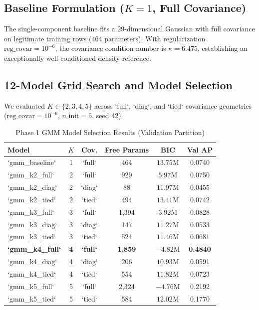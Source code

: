 \documentclass[conference]{IEEEtran}
\begin{document}
\subsection{Baseline Formulation ($K=1$, Full Covariance)}
The single-component baseline fits a 29-dimensional Gaussian with full covariance on legitimate training rows ($464$ parameters). With regularization $\text{reg\_covar} = 10^{-6}$, the covariance condition number is $\kappa = 6.475$, establishing an exceptionally well-conditioned density reference.

\subsection{12-Model Grid Search and Model Selection}
We evaluated $K \in \{2, 3, 4, 5\}$ across `full`, `diag`, and `tied` covariance geometries ($\text{reg\_covar}=10^{-6}$, $n\_\text{init}=5$, seed 42).

\begin{table}[htbp]
\caption{Phase 1 GMM Model Selection Results (Validation Partition)}
\centering
\begin{tabular}{lccccc}
\toprule
Model & $K$ & Cov. & Free Params & BIC & Val AP \\
\midrule
`gmm_baseline` & 1 & `full` & 464 & $13.75\text{M}$ & 0.0740 \\
`gmm_k2_full` & 2 & `full` & 929 & $5.97\text{M}$ & 0.0750 \\
`gmm_k2_diag` & 2 & `diag` & 88 & $11.97\text{M}$ & 0.0455 \\
`gmm_k2_tied` & 2 & `tied` & 494 & $13.41\text{M}$ & 0.0742 \\
`gmm_k3_full` & 3 & `full` & 1,394 & $3.92\text{M}$ & 0.0828 \\
`gmm_k3_diag` & 3 & `diag` & 147 & $11.27\text{M}$ & 0.0533 \\
`gmm_k3_tied` & 3 & `tied` & 524 & $11.46\text{M}$ & 0.0681 \\
\textbf{`gmm_k4_full`} & \textbf{4} & \textbf{`full`} & \textbf{1,859} & \textbf{$-4.82\text{M}$} & \textbf{0.4840} \\
`gmm_k4_diag` & 4 & `diag` & 206 & $10.93\text{M}$ & 0.0591 \\
`gmm_k4_tied` & 4 & `tied` & 554 & $11.82\text{M}$ & 0.0723 \\
`gmm_k5_full` & 5 & `full` & 2,324 & $-4.76\text{M}$ & 0.2192 \\
`gmm_k5_tied` & 5 & `tied` & 584 & $12.02\text{M}$ & 0.1770 \\
\bottomrule
\end{tabular}
\label{tab:gmm_grid}
\end{table}
\end{document}
